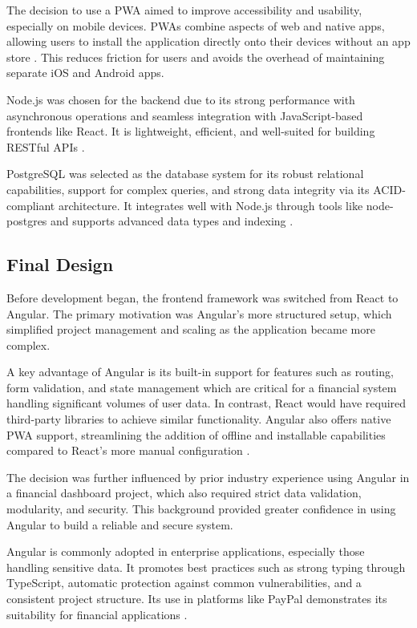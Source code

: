 \documentclass{l4proj}
\begin{document}
The decision to use a PWA aimed to improve accessibility and usability, especially on mobile devices. PWAs combine aspects of web and native apps, allowing users to install the application directly onto their devices without an app store \citep{mozilla_progressive_2025}. This reduces friction for users and avoids the overhead of maintaining separate iOS and Android apps.

Node.js was chosen for the backend due to its strong performance with asynchronous operations and seamless integration with JavaScript-based frontends like React. It is lightweight, efficient, and well-suited for building RESTful APIs \citep{geeksforgeeks_pros_2024}.

PostgreSQL was selected as the database system for its robust relational capabilities, support for complex queries, and strong data integrity via its ACID-compliant architecture. It integrates well with Node.js through tools like node-postgres and supports advanced data types and indexing \citep{postgresql_about, npm_pg_2025}.

\subsection{Final Design}
Before development began, the frontend framework was switched from React to Angular. The primary motivation was Angular’s more structured setup, which simplified project management and scaling as the application became more complex.

A key advantage of Angular is its built-in support for features such as routing, form validation, and state management which are critical for a financial system handling significant volumes of user data. In contrast, React would have required third-party libraries to achieve similar functionality. Angular also offers native PWA support, streamlining the addition of offline and installable capabilities compared to React’s more manual configuration \citep{sakthi_unlocking_2024}.

The decision was further influenced by prior industry experience using Angular in a financial dashboard project, which also required strict data validation, modularity, and security. This background provided greater confidence in using Angular to build a reliable and secure system.

Angular is commonly adopted in enterprise applications, especially those handling sensitive data. It promotes best practices such as strong typing through TypeScript, automatic protection against common vulnerabilities, and a consistent project structure. Its use in platforms like PayPal demonstrates its suitability for financial applications \citep{sols_angular_nodate}.
\end{document}
